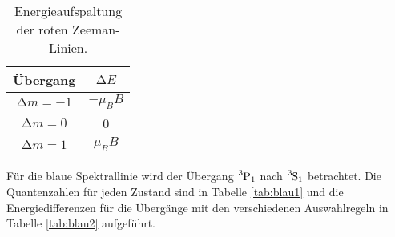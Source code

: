 \begin{table}
  \centering
  \caption{Energieaufspaltung der roten Zeeman-Linien.}
  \begin{tabular}{c c}
    \toprule
    Übergang & $\increment E$ \\
    \midrule
    $\increment m = -1$ & $-\mu_B B$ \\
    $\increment m = 0$ & 0 \\
    $\increment m = 1$ & $\mu_B B$ \\
    \bottomrule
\end{tabular}
  \label{tab:rot2}
\end{table}

Für die blaue Spektrallinie wird der Übergang $\ce{^{3}P_1}$ nach $\ce{^{3}S_1}$
betrachtet. Die Quantenzahlen für jeden Zustand sind in Tabelle \ref{tab:blau1}
und die Energiedifferenzen für die Übergänge mit den verschiedenen Auswahlregeln
in Tabelle \ref{tab:blau2} aufgeführt.

